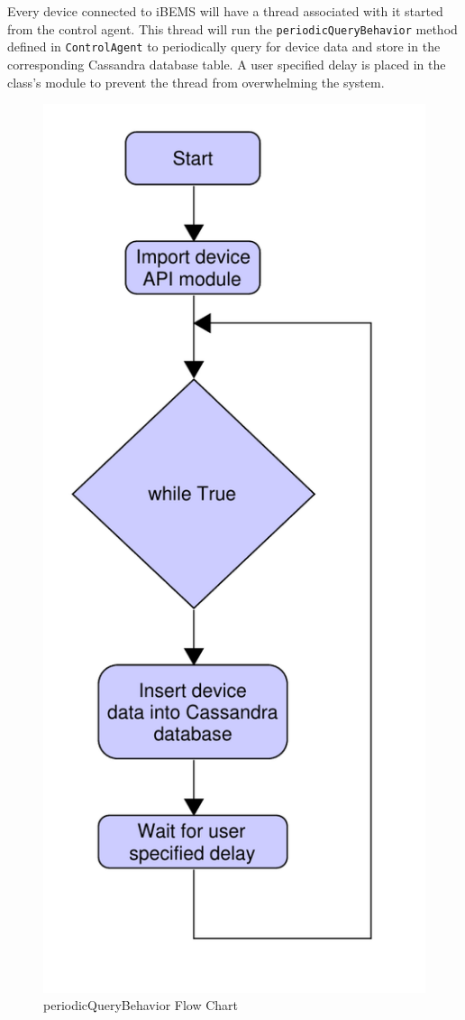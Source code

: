 \documentclass[conference]{IEEEtran}
\begin{document}
Every device connected to iBEMS will have a thread associated with it started from the control agent. This thread will run the \texttt{periodicQueryBehavior} method defined in \texttt{ControlAgent} to periodically query for device data and store in the corresponding Cassandra database table. A user specified delay is placed in the class's module to prevent the thread from overwhelming the system.

\begin{figure}[htbp]
    \centering
    \includegraphics[scale=0.4]{figs/agents/periodicQueryBehavior.pdf}
    \caption{periodicQueryBehavior Flow Chart}
    \label{fig:periodicQueryBehavior}
\end{figure}
\end{document}
